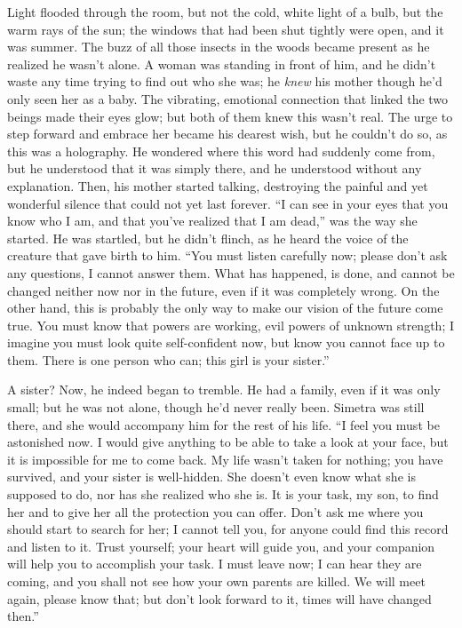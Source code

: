 Light flooded through the room, but not the cold, white light of a bulb, but the warm rays of the sun; the windows that had been shut tightly were open, and it was summer. The buzz of all those insects in the woods became present as he realized he wasn't alone. 
A woman was standing in front of him, and he didn't waste any time trying to find out who she was; he \emph{knew} his mother though he'd only seen her as a baby. The vibrating, emotional connection that linked the two beings made their eyes glow; but both of them knew this wasn't real. The urge to step forward and embrace her became his dearest wish, but he couldn't do so, as this was a holography. He wondered where this word had suddenly come from, but he understood that it was simply there, and he understood without any explanation. 
Then, his mother started talking, destroying the painful and yet wonderful silence that could not yet last forever. 
\enquote{I can see in your eyes that you know who I am, and that you've realized that I am dead,}
was the way she started. He was startled, but he didn't flinch, as he heard the voice of the creature that gave birth to him. 
\enquote{You must listen carefully now; please don't ask any questions, I cannot answer them. What has happened, is done, and cannot be changed neither now nor in the future, even if it was completely wrong. On the other hand, this is probably the only way to make our vision of the future come true. You must know that powers are working, evil powers of unknown strength; I imagine you must look quite self-confident now, but know you cannot face up to them. There is one person who can; this girl is your sister.}

A sister? Now, he indeed began to tremble. He had a family, even if it was only small; but he was not alone, though he'd never really been. Simetra was still there, and she would accompany him for the rest of his life. 
\enquote{I feel you must be astonished now. I would give anything to be able to take a look at your face, but it is impossible for me to come back. My life wasn't taken for nothing; you have survived, and your sister is well-hidden. She doesn't even know what she is supposed to do, nor has she realized who she is. It is your task, my son, to find her and to give her all the protection you can offer. Don't ask me where you should start to search for her; I cannot tell you, for anyone could find this record and listen to it. Trust yourself; your heart will guide you, and your companion will help you to accomplish your task. I must leave now; I can hear they are coming, and you shall not see how your own parents are killed. We will meet again, please know that; but don't look forward to it, times will have changed then.}

